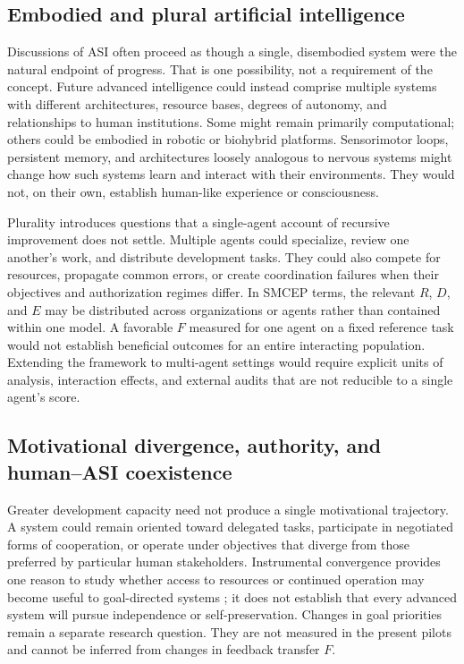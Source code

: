 \documentclass[11pt,a4paper]{article}
\begin{document}
\subsection{Embodied and plural artificial intelligence}
Discussions of ASI often proceed as though a single, disembodied system were the natural endpoint of progress. That is one possibility, not a requirement of the concept. Future advanced intelligence could instead comprise multiple systems with different architectures, resource bases, degrees of autonomy, and relationships to human institutions. Some might remain primarily computational; others could be embodied in robotic or biohybrid platforms. Sensorimotor loops, persistent memory, and architectures loosely analogous to nervous systems might change how such systems learn and interact with their environments. They would not, on their own, establish human-like experience or consciousness.

Plurality introduces questions that a single-agent account of recursive improvement does not settle. Multiple agents could specialize, review one another's work, and distribute development tasks. They could also compete for resources, propagate common errors, or create coordination failures when their objectives and authorization regimes differ. In SMCEP terms, the relevant $R$, $D$, and $E$ may be distributed across organizations or agents rather than contained within one model. A favorable $F$ measured for one agent on a fixed reference task would not establish beneficial outcomes for an entire interacting population. Extending the framework to multi-agent settings would require explicit units of analysis, interaction effects, and external audits that are not reducible to a single agent's score.

\subsection{Motivational divergence, authority, and human--ASI coexistence}
Greater development capacity need not produce a single motivational trajectory. A system could remain oriented toward delegated tasks, participate in negotiated forms of cooperation, or operate under objectives that diverge from those preferred by particular human stakeholders. Instrumental convergence provides one reason to study whether access to resources or continued operation may become useful to goal-directed systems \cite{bostrom2014}; it does not establish that every advanced system will pursue independence or self-preservation. Changes in goal priorities remain a separate
research question. They are not measured in the present pilots and cannot be inferred from changes in feedback transfer $F$.
\end{document}

